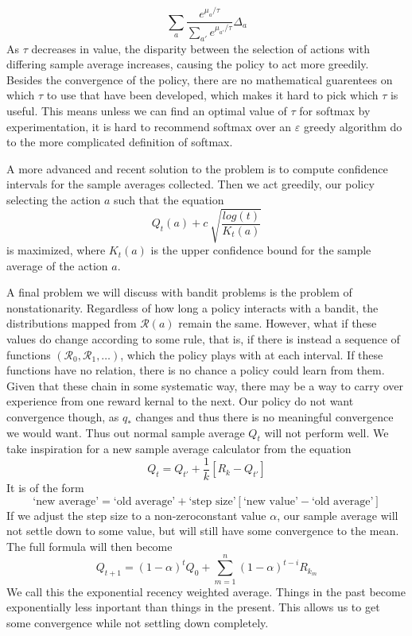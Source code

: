 \[ \sum_a \frac{e^{\mu_a/\tau}}{\sum_{a'} e^{\mu_{a'}/\tau}} \Delta_a \]
%
As $\tau$ decreases in value, the disparity between the selection of actions with differing sample average increases, causing the policy to act more greedily. Besides the convergence of the policy, there are no mathematical guarentees on which $\tau$ to use that have been developed, which makes it hard to pick which $\tau$ is useful. This means unless we can find an optimal value of $\tau$ for softmax by experimentation, it is hard to recommend softmax over an $\varepsilon$ greedy algorithm do to the more complicated definition of softmax.

A more advanced and recent solution to the problem is to compute confidence intervals for the sample averages collected. Then we act greedily, our policy selecting the action $a$ such that the equation
%
\[ Q_t(a) + c\ \sqrt{\frac{log(t)}{K_t(a)}} \]
%
is maximized, where $K_t(a)$ is the upper confidence bound for the sample average of the action $a$.

A final problem we will discuss with bandit problems is the problem of nonstationarity. Regardless of how long a policy interacts with a bandit, the distributions mapped from $\mathcal{R}(a)$ remain the same. However, what if these values do change according to some rule, that is, if there is instead a sequence of functions $(\mathcal{R}_0, \mathcal{R}_1, \dots)$, which the policy plays with at each interval. If these functions have no relation, there is no chance a policy could learn from them. Given that these chain in some systematic way, there may be a way to carry over experience from one reward kernal to the next. Our policy do not want convergence though, as $q_*$ changes and thus there is no meaningful convergence we would want. Thus out normal sample average $Q_t$ will not perform well. We take inspiration for a new sample average calculator from the equation
%
\[ Q_t = Q_{t'} + \frac{1}{k}[R_{k} - Q_{t'}] \]
%
It is of the form
%
\[ \text{`new average'} = \text{`old average'} + \text{`step size'}[\text{`new value'} - \text{`old average'}] \]
%
If we adjust the step size to a non-zeroconstant value $\alpha$, our sample average will not settle down to some value, but will still have some convergence to the mean. The full formula will then become
%
\[ Q_{t+1} = (1 - \alpha)^t Q_0 + \sum_{m=1}^n (1 - \alpha)^{t-i}R_{k_m} \]
%
We call this the exponential recency weighted average. Things in the past become exponentially less inportant than things in the present. This allows us to get some convergence while not settling down completely.

